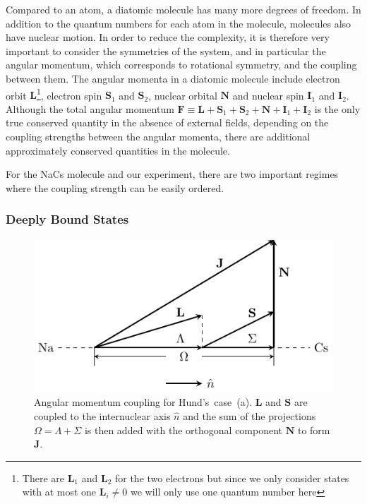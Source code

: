 Compared to an atom, a diatomic molecule has many more degrees of freedom.
In addition to the quantum numbers for each atom in the molecule,
molecules also have nuclear motion.
In order to reduce the complexity, it is therefore very important to consider the
symmetries of the system, and in particular the angular momentum,
which corresponds to rotational symmetry, and the coupling between them.
The angular momenta in a diatomic molecule include electron orbit $\mathbf{L}$\footnote{
  There are $\mathbf{L}_1$ and $\mathbf{L}_2$ for the two electrons but since
  we only consider states with at most one $\mathbf{L}_i\neq0$
  we will only use one quantum number here},
electron spin $\mathbf{S}_1$ and $\mathbf{S}_2$, nuclear orbital $\mathbf{N}$
and nuclear spin $\mathbf{I}_1$ and $\mathbf{I}_2$.
Although the total angular momentum
$\mathbf{F}\equiv\mathbf{L}+\mathbf{S}_1+\mathbf{S}_2+\mathbf{N}+\mathbf{I}_1+\mathbf{I}_2$
is the only true conserved quantity in the absence of external fields,
depending on the coupling strengths between the angular momenta,
there are additional approximately conserved quantities in the molecule.

For the NaCs molecule and our experiment, there are two important regimes where the coupling
strength can be easily ordered.

\subsubsection{Deeply Bound States}
\label{ch:pa:angular-momenta:deep}

\begin{figure}
  \centering
  \includegraphics[width=\textwidth]{figures/pa_hunds_case_a.pdf}
  \caption[Hund's~case~(a)]{
    Angular momentum coupling for Hund's~case~(a).
    $\mathbf{L}$ and $\mathbf{S}$ are coupled to the internuclear axis $\hat n$
    and the sum of the projections $\Omega=\Lambda+\Sigma$ is then
    added with the orthogonal component $\mathbf{N}$ to form $\mathbf{J}$.
    \label{fig:pa:hunds-case-a}}
\end{figure}

